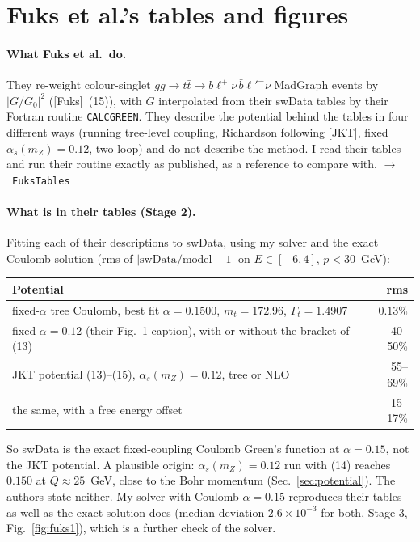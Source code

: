 \documentclass[11pt]{article}
\newcommand{\code}[1]{\texttt{#1}}
\newcommand{\Gt}{\Gamma_t}
\newcommand{\alphas}{\alpha_s}
\newcommand{\JKT}{[JKT]}
\newcommand{\Fuks}{[Fuks]}
\newcommand{\fn}[1]{\hfill$\to$~\code{#1}}
\begin{document}
\section{Fuks et al.'s tables and figures}
\label{sec:fuks}

\paragraph{What Fuks et al.\ do.} They re-weight colour-singlet $gg\to t\bar t\to b\ell^+\nu\,\bar b\ell'^-\bar\nu$ MadGraph events by
$|G/G_0|^2$ (\Fuks\ (15)), with $G$ interpolated from their swData tables by their Fortran routine \code{CALCGREEN}. They describe the
potential behind the tables in four different ways (running tree-level coupling, Richardson following \JKT, fixed
$\alphas(m_Z)=0.12$, two-loop) and do not describe the method. I read their tables and run their routine exactly as published, as a
reference to compare with. \fn{FuksTables}

\paragraph{What is in their tables (Stage 2).} Fitting each of their descriptions to swData, using my solver and the exact Coulomb
solution (rms of $|\text{swData}/\text{model}-1|$ on $E\in[-6,4]$, $p<30$~GeV):

\begin{center}\small
\begin{tabularx}{\linewidth}{@{}Lr@{}}
\toprule
Potential & rms\\
\midrule
fixed-$\alpha$ tree Coulomb, best fit $\alpha=0.1500$, $m_t=172.96$, $\Gt=1.4907$ & $0.13\%$\\
fixed $\alpha=0.12$ (their Fig.~1 caption), with or without the bracket of (13) & 40--50\%\\
JKT potential (13)--(15), $\alphas(m_Z)=0.12$, tree or NLO & 55--69\%\\
\quad the same, with a free energy offset & 15--17\%\\
\bottomrule
\end{tabularx}
\end{center}

\noindent So swData is the exact fixed-coupling Coulomb Green's function at $\alpha=0.15$, not the JKT potential. A plausible origin:
$\alphas(m_Z)=0.12$ run with (14) reaches $0.150$ at $Q\approx25$~GeV, close to the Bohr momentum (Sec.~\ref{sec:potential}). The
authors state neither. My solver with Coulomb $\alpha=0.15$ reproduces their tables as well as the exact solution does (median
deviation $2.6\times10^{-3}$ for both, Stage 3, Fig.~\ref{fig:fuks1}), which is a further check of the solver.
\end{document}
